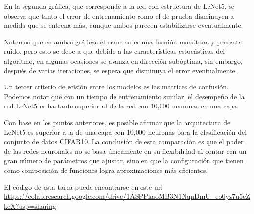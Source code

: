 \documentclass{article}
\begin{document}
\begin{enumerate}
\begin{itemize}
        En la segunda gráfica, que corresponde a la red con estructura de LeNet5, se 
        observa que tanto el error de entrenamiento como el de prueba disminuyen a 
        medida que se entrena más, aunque ambos parecen estabilizarse eventualmente.
        
        Notemos que en ambas gráficas el error no es una fucnión monótona y presenta 
        ruido, pero esto se debe a que debido a las características estocásticas del
        algoritmo, en algunas ocasiones se avanza en dirección subóptima, sin embargo,
        después de varias iteraciones, se espera que disminuya el error eventualmente.

        Un tercer criterio de ecisión entre los modelos es las matrices de confusión.
        Podemos notar que con un tiempo de entrenamiento similar, el desempeño de la red
        LeNet5 es bastante superior al de la red con 10,000 neuronas en una capa.

        Con base en los puntos anteriores, es posible afirmar que la arquitectura de
        LeNet5 es superior a la de una capa con 10,000 neuronas para la clasificación
        del conjunto de datos CIFAR10. La conclusión de esta comparación es que el poder
        de las redes neuronales no se basa únicamente en su flexibilidad al contar con
        un gran número de parámetros que ajustar, sino en que la configuración que tienen
        como composición de funciones logra aproximaciones más eficientes.

    \end{itemize}


    El código de esta tarea puede encontrarse en este url \url{https://colab.research.google.com/drive/1ASPPkaoMB3N1NqnDmU_eo0yz7u5cZkeX?usp=sharing}



        
   
\end{enumerate}




 
\end{document}
